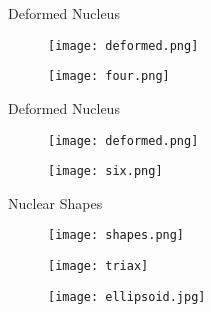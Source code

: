 \documentclass [11pt]{beamer}
\begin{document}
\begin{frame}{Deformed Nucleus}
\begin{multicols}{2}
\begin{figure}
\texttt{[image: deformed.png]}
\end{figure}
\begin{center}
\begin{figure}
\texttt{[image: four.png]}
\end{figure}
\end{center}
\end{multicols}
\end{frame}

\begin{frame}{Deformed Nucleus}
\begin{multicols}{2}
\begin{figure}
\texttt{[image: deformed.png]}
\end{figure}
\begin{center}
\begin{figure}
\texttt{[image: six.png]}
\end{figure}
\end{center}
\end{multicols}
\end{frame}


\begin{frame}{Nuclear Shapes}
\centering
{} \space \space \space \space \space \space \space \space \space \space \space \space \space \space \space \space \space \space \space \space \space \space \space \space \space \space {} \space \space \space \space \space \space \space \space \space \space \space \space \space \space \space \space \space \space \space \space \space {}
\begin{figure}
\texttt{[image: shapes.png]}
\end{figure}
\begin{multicols}{2}
\begin{figure}
\texttt{[image: triax]}
\end{figure}
\begin{figure}
\texttt{[image: ellipsoid.jpg]}
\end{figure}
\end{multicols}
\end{frame}
\end{document}

